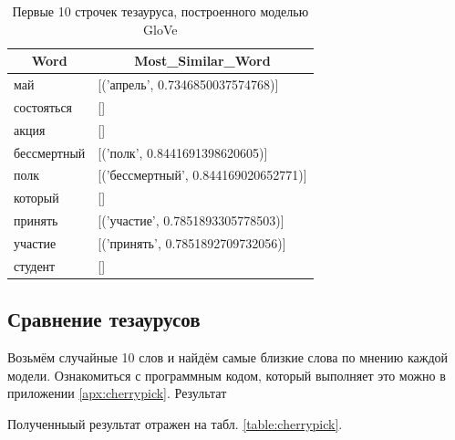 \documentclass[coursework]{SCWorks}
\begin{document}
\begin{table}[!h]
    \centering
    \small
    \begin{tabular}{|l|l|}
        \hline
        \multicolumn{1}{|c|}{\textbf{Word}} & \multicolumn{1}{c|}{\textbf{Most\_Similar\_Word}} \\ \hline
        май                                 & {[}('апрель', 0.7346850037574768){]}              \\ \hline
        состояться                          & {[}{]}                                            \\ \hline
        акция                               & {[}{]}                                            \\ \hline
        бессмертный                         & {[}('полк', 0.8441691398620605){]}                \\ \hline
        полк                                & {[}('бессмертный', 0.844169020652771){]}          \\ \hline
        который                             & {[}{]}                                            \\ \hline
        принять                             & {[}('участие', 0.7851893305778503){]}             \\ \hline
        участие                             & {[}('принять', 0.7851892709732056){]}             \\ \hline
        студент                             & {[}{]}                                            \\ \hline
    \end{tabular}
    \caption{Первые 10 строчек тезауруса, построенного моделью GloVe}
    \label{table:glove-example}
\end{table}

\subsection{Сравнение тезаурусов}
Возьмём случайные 10 слов и найдём самые близкие слова по мнению каждой модели. Ознакомиться с программным кодом, который выполняет это можно в приложении \ref{apx:cherrypick}. Результат 

Полученныый результат отражен на табл. \ref{table:cherrypick}.
\end{document}
